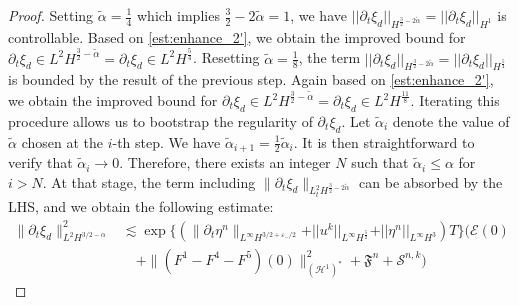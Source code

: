 \documentclass[letterpaper,reqno,10pt,twoside]{amsart}
\theoremstyle{definition}
\theoremstyle{remark}
\def\p{\partial}
\begin{document}
\begin{proof}
		Setting $\tilde{\alpha}=\frac{1}{4}$ which implies $\frac{3}{2}-2\tilde\alpha=1$, we have $\vert \vert \partial_{t}\xi_{d}\vert \vert_{H^{\frac{3}{2}-2\tilde{\alpha}}}=\vert \vert \partial_{t}\xi_{d}\vert \vert_{H^{1}}$ is controllable. Based on \eqref{est:enhance_2'}, we obtain the improved bound for $\partial_{t}\xi_{d}\in L^{2}H^{\frac{3}{2}-\tilde\alpha}=\partial_{t}\xi_{d}\in L^{2}H^{\frac{5}{4}}$. 
		Resetting $\tilde\alpha=\frac{1}{8}$, the term $\vert \vert \partial_{t}\xi_{d}\vert \vert_{H^{\frac{3}{2}-2\tilde{\alpha}}}=\vert \vert \partial_{t}\xi_{d}\vert \vert_{H^{\frac{5}{4}}}$ is bounded by the result of the previous step. Again based on \eqref{est:enhance_2'}, we obtain the improved bound for $\partial_{t}\xi_{d}\in L^{2}H^{\frac{3}{2}-\tilde\alpha}=\partial_{t}\xi_{d}\in L^{2}H^{\frac{11}{8}}$.
		Iterating this procedure allows us to bootstrap the regularity of $\p_{t}\xi_{d}$. Let $\tilde{\alpha}_{i}$ denote the value of $\tilde{\alpha}$ chosen at the $i$-th step. {We have $\tilde{\alpha}_{i+1}=\frac{1}{2}\tilde{\alpha}_{i}$}. It is then straightforward to verify that $\tilde{\alpha}_{i}\rightarrow 0$. Therefore, there exists an integer $N$ such that $\tilde{\alpha}_{i}\leq \alpha$ for $i>N$. At that stage, the term including $\|\p_{t}\xi_{d}\|_{L_{t}^{2}H^{\frac{3}{2}-2\tilde{\alpha}}}$ can be absorbed by the LHS, and we obtain the following estimate:
		\begin{equation}\label{est:enhance_2}
			\begin{aligned}
				\|\p_t\xi_{d}\|_{L^2H^{3/2-{\alpha}}}^2&\lesssim\exp\big\{(\|\p_t\eta^{n}\|_{L^\infty H^{3/2+\varepsilon_-/2}}+\vert \vert u^{k}\vert \vert_{L^{\infty}H^{\frac{5}{2}}}+\vert \vert \eta^{n}\vert \vert_{L^{\infty}H^{3}})T\big\}\bigg(\mathcal{E}(0)\\
				&\quad +\|(F^1-F^4-F^5)(0)\|_{(\mathcal{H}^1)^\ast}^2 +\mathfrak{F}^{n}+\mathscr{S}^{n,k}\bigg)
			\end{aligned}
		\end{equation}
		

\end{proof}
\end{document}
